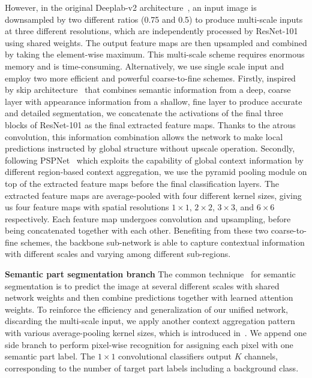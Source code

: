 \documentclass[runningheads]{llncs}
\begin{document}
However, in the original Deeplab-v2 architecture~\cite{chen2016deeplab}, an input image is downsampled by two different ratios (0.75 and 0.5) to produce multi-scale inputs at three different resolutions, which are independently processed by ResNet-101 using shared weights. The output feature maps are then upsampled and combined by taking the element-wise maximum. This multi-scale scheme requires enormous memory and is time-consuming. Alternatively, we use single scale input and employ two more efficient and powerful coarse-to-fine schemes. Firstly, inspired by skip architecture~\cite{long2014fully} that combines semantic information from a deep, coarse layer with appearance information from a shallow, fine layer to produce accurate and detailed segmentation, we concatenate the activations of the final three blocks of ResNet-101 as the final extracted feature maps. Thanks to the atrous convolution, this information combination allows the network to make local predictions instructed by global structure without upscale operation. Secondly, following PSPNet~\cite{Zhao_2017_CVPR} which exploits the capability of global context information by different region-based context aggregation, we use the pyramid pooling module on top of the extracted feature maps before the final classification layers. The extracted feature maps are average-pooled with four different kernel sizes, giving us four feature maps with spatial resolutions $1\times1$, $2\times2$, $3\times3$, and $6\times6$ respectively. Each feature map undergoes convolution and upsampling, before being concatenated together with each other. Benefiting from these two coarse-to-fine schemes, the backbone sub-network is able to capture contextual information with different scales and varying among different sub-regions.


\textbf{Semantic part segmentation branch}
The common technique~\cite{chen2015attention,chen2016deeplab} for semantic segmentation is to predict the image at several different scales with shared network weights and then combine predictions together with learned attention weights. To reinforce the efficiency and generalization of our unified network, discarding the multi-scale input, we apply another context aggregation pattern with various average-pooling kernel sizes, which is introduced in~\cite{Zhao_2017_CVPR}. We append one side branch to perform pixel-wise recognition for assigning each pixel with one semantic part label. The $1\times1$ convolutional classifiers output $K$ channels, corresponding to the number of target part labels including a background class.
\end{document}
